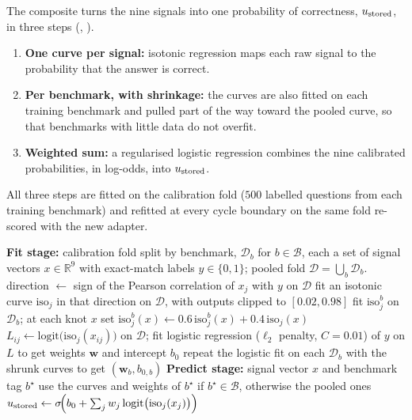 The composite turns the nine signals into one probability of correctness, $u_{\text{stored}}$, in three steps (, ).
\begin{enumerate}
    \item \textbf{One curve per signal:} isotonic regression maps each raw signal to the probability that the answer is correct.
    \item \textbf{Per benchmark, with shrinkage:} the curves are also fitted on each training benchmark and pulled part of the way toward the pooled curve, so that benchmarks with little data do not overfit.
    \item \textbf{Weighted sum:} a regularised logistic regression combines the nine calibrated probabilities, in log-odds, into $u_{\text{stored}}$.
\end{enumerate}
All three steps are fitted on the calibration fold ($500$ labelled questions from each training benchmark) and refitted at every cycle boundary on the same fold re-scored with the new adapter.



\begin{algorithm}[!htbp]
\caption[Calibrated probability composite (fit and predict).]{Calibrated probability composite (fit and predict).}
\label{alg:composite}
\begin{algorithmic}[1]
\Statex \textbf{Fit stage:} calibration fold split by benchmark, $\mathcal{D}_{b}$ for $b \in \mathcal{B}$, each a set of signal vectors $x \in \mathbb{R}^{9}$ with exact-match labels $y \in \{0,1\}$; pooled fold $\mathcal{D} = \bigcup_{b}\mathcal{D}_{b}$.
    \State direction $\gets$ sign of the Pearson correlation of $x_{j}$ with $y$ on $\mathcal{D}$
    \State fit an isotonic curve $\mathrm{iso}_{j}$ in that direction on $\mathcal{D}$, with outputs clipped to $[0.02, 0.98]$
\EndFor
{}
    \State fit $\mathrm{iso}^{b}_{j}$ on $\mathcal{D}_{b}$; at each knot $x$ set $\mathrm{iso}^{b}_{j}(x) \gets 0.6\,\mathrm{iso}^{b}_{j}(x) + 0.4\,\mathrm{iso}_{j}(x)$
\EndFor
\State $L_{ij} \gets \mathrm{logit}\big(\mathrm{iso}_{j}(x_{ij})\big)$ on $\mathcal{D}$; fit logistic regression ($\ell_{2}$ penalty, $C = 0.01$) of $y$ on $L$ to get weights $\mathbf{w}$ and intercept $b_{0}$
\State repeat the logistic fit on each $\mathcal{D}_{b}$ with the shrunk curves to get $(\mathbf{w}_{b}, b_{0,b})$
\Statex \textbf{Predict stage:} signal vector $x$ and benchmark tag $b^{\star}$
\State use the curves and weights of $b^{\star}$ if $b^{\star} \in \mathcal{B}$, otherwise the pooled ones
\State \Return $u_{\text{stored}} \gets \sigma\!\Big(b_{0} + \sum_{j} w_{j}\, \mathrm{logit}\big(\mathrm{iso}_{j}(x_{j})\big)\Big)$
\end{algorithmic}
\end{algorithm}

